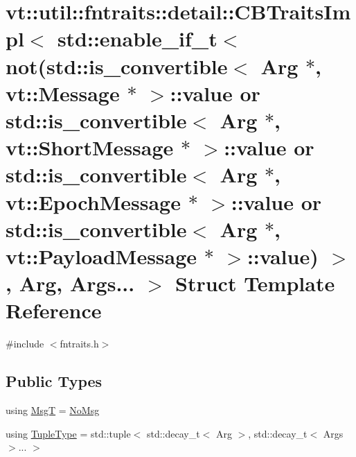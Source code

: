 \hypertarget{structvt_1_1util_1_1fntraits_1_1detail_1_1_c_b_traits_impl_3_01std_1_1enable__if__t_3_01not_07st51a32586efc3bbebdea14e54779d89f5}{}\section{vt\+:\+:util\+:\+:fntraits\+:\+:detail\+:\+:C\+B\+Traits\+Impl$<$ std\+:\+:enable\+\_\+if\+\_\+t$<$ not(std\+:\+:is\+\_\+convertible$<$ Arg $\ast$, vt\+:\+:Message $\ast$ $>$\+:\+:value or std\+:\+:is\+\_\+convertible$<$ Arg $\ast$, vt\+:\+:Short\+Message $\ast$ $>$\+:\+:value or std\+:\+:is\+\_\+convertible$<$ Arg $\ast$, vt\+:\+:Epoch\+Message $\ast$ $>$\+:\+:value or std\+:\+:is\+\_\+convertible$<$ Arg $\ast$, vt\+:\+:Payload\+Message $\ast$ $>$\+:\+:value) $>$, Arg, Args... $>$ Struct Template Reference}
\label{structvt_1_1util_1_1fntraits_1_1detail_1_1_c_b_traits_impl_3_01std_1_1enable__if__t_3_01not_07st51a32586efc3bbebdea14e54779d89f5}


{\ttfamily \#include $<$fntraits.\+h$>$}

\subsection*{Public Types}
\begin{DoxyCompactItemize}
\item 
using \hyperlink{structvt_1_1util_1_1fntraits_1_1detail_1_1_c_b_traits_impl_3_01std_1_1enable__if__t_3_01not_07st51a32586efc3bbebdea14e54779d89f5_a11c6e1b0c3ef3b5dcde9611fd16af4c6}{MsgT} = \hyperlink{structvt_1_1util_1_1fntraits_1_1detail_1_1_no_msg}{No\+Msg}
\item 
using \hyperlink{structvt_1_1util_1_1fntraits_1_1detail_1_1_c_b_traits_impl_3_01std_1_1enable__if__t_3_01not_07st51a32586efc3bbebdea14e54779d89f5_a96ef7c69232c423fe8842784c0f14765}{Tuple\+Type} = std\+::tuple$<$ std\+::decay\+\_\+t$<$ Arg $>$, std\+::decay\+\_\+t$<$ Args $>$... $>$
\end{DoxyCompactItemize}



